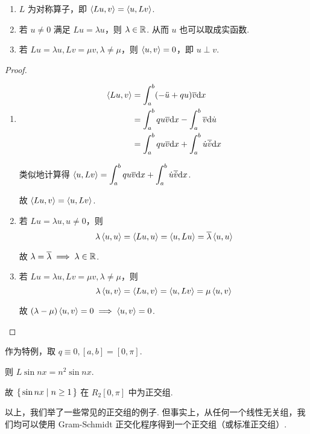 \begin{property}
    \begin{enumerate}
        \item $L$ 为对称算子，即 $\left\langle{Lu,v}\right\rangle=\left\langle{u,Lv}\right\rangle$.
        
        \item 若 $u\ne 0$ 满足 $Lu=\lambda u$，则 $\lambda\in\mathbb{R}$. 从而 $u$ 也可以取成实函数.
        
        \item 若 $Lu=\lambda u,Lv=\mu v,\lambda\ne\mu$，则 $\left\langle{u,v}\right\rangle=0$，即 $u\perp v$.
    \end{enumerate}
\end{property}
\begin{proof}
    \begin{enumerate}
        \item 
$$
\begin{aligned}
    \left\langle{Lu,v}\right\rangle&=\int_a^b(-\ddot{u}+qu)\overline{v}\mathrm{d} x\\
    &=\int_a^bqu\overline{v}\mathrm{d} x-\int_a^b\overline{v}\mathrm{d}\dot{u}\\
    &=\int_a^bqu\overline{v}\mathrm{d} x+\int_a^b\dot{u}\overline{\dot{v}}\mathrm{d} x
\end{aligned}
$$

        类似地计算得 $\left\langle{u,Lv}\right\rangle=\displaystyle\int_a^bqu\overline{v}\mathrm{d} x+\int_a^b\dot{u}\overline{\dot{v}}\mathrm{d} x$.

        故 $\left\langle{Lu,v}\right\rangle=\left\langle{u,Lv}\right\rangle$.

        \item 若 $Lu=\lambda u,u\ne 0$，则
$$
\lambda\left\langle{u,u}\right\rangle=\left\langle{Lu,u}\right\rangle=\left\langle{u,Lu}\right\rangle=\overline{\lambda}\left\langle{u,u}\right\rangle
$$

        故 $\lambda=\overline{\lambda}\implies\lambda\in\mathbb{R}$.

        \item 若 $Lu=\lambda u,Lv=\mu v,\lambda\ne\mu$，则
$$
\lambda\left\langle{u,v}\right\rangle=\left\langle{Lu,v}\right\rangle=\left\langle{u,Lv}\right\rangle=\mu\left\langle{u,v}\right\rangle
$$

        故 $(\lambda-\mu)\left\langle{u,v}\right\rangle=0\implies\left\langle{u,v}\right\rangle=0$.
    \end{enumerate}
\end{proof}

作为特例，取 $q\equiv 0,[a,b]=[0,\pi]$.

则 $L\sin nx=n^2\sin nx$.

故 $\set{\sin nx|n\ge 1}$ 在 $R_2[0,\pi]$ 中为正交组.


以上，我们举了一些常见的正交组的例子. 但事实上，从任何一个线性无关组，我们均可以使用 Gram-Schmidt 正交化程序得到一个正交组（或标准正交组）.

